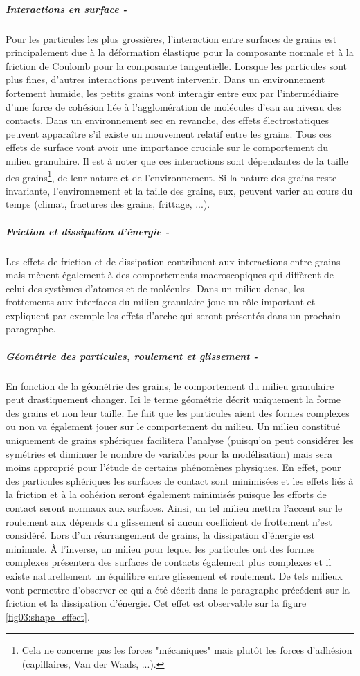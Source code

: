 			\subparagraph{Interactions en surface -}
				Pour les particules les plus grossières, l'interaction entre surfaces de grains est principalement due à la déformation élastique pour la composante normale et à la friction de Coulomb pour la composante tangentielle. Lorsque les particules sont plus fines, d'autres interactions peuvent intervenir. Dans un environnement fortement humide, les petits grains vont interagir entre eux par l'intermédiaire d'une force de cohésion liée à l'agglomération de molécules d'eau au niveau des contacts. Dans un environnement sec en revanche, des effets électrostatiques peuvent apparaître s'il existe un mouvement relatif entre les grains. Tous ces effets de surface vont avoir une importance cruciale sur le comportement du milieu granulaire. Il est à noter que ces interactions sont dépendantes de la taille des grains\footnote{Cela ne concerne pas les forces "mécaniques" mais plutôt les forces d'adhésion (capillaires, Van der Waals, ...).}, de leur nature et de l'environnement. Si la nature des grains reste invariante, l'environnement et la taille des grains, eux, peuvent varier au cours du temps (climat, fractures des grains, frittage, ...).
			\subparagraph{Friction et dissipation d'énergie -}\label{para03:friction}
				Les effets de friction et de dissipation contribuent aux interactions entre grains mais mènent également à des comportements macroscopiques qui diffèrent de celui des systèmes d'atomes et de molécules. Dans un milieu dense, les frottements aux interfaces du milieu granulaire joue un rôle important et expliquent par exemple les effets d'arche qui seront présentés dans un prochain paragraphe.
			\subparagraph{Géométrie des particules, roulement et glissement -}\label{para03:glissement}
				En fonction de la géométrie des grains, le comportement du milieu granulaire peut drastiquement changer. Ici le terme géométrie décrit uniquement la forme des grains et non leur taille. Le fait que les particules aient des formes complexes ou non va également jouer sur le comportement du milieu. Un milieu constitué uniquement de grains sphériques facilitera l'analyse (puisqu'on peut considérer les symétries et diminuer le nombre de variables pour la modélisation) mais sera moins approprié pour l'étude de certains phénomènes physiques. En effet, pour des particules sphériques les surfaces de contact sont minimisées et les effets liés à la friction et à la cohésion seront également minimisés puisque les efforts de contact seront normaux aux surfaces. Ainsi, un tel milieu mettra l'accent sur le roulement aux dépends du glissement si aucun coefficient de frottement n'est considéré. Lors d'un réarrangement de grains, la dissipation d'énergie est minimale. \`A l'inverse, un milieu pour lequel les particules ont des formes complexes présentera des surfaces de contacts également plus complexes et il existe naturellement un équilibre entre glissement et roulement. De tels milieux vont permettre d'observer ce qui a été décrit dans le paragraphe précédent sur la friction et la dissipation d'énergie. Cet effet est observable sur la figure \ref{fig03:shape_effect}.
